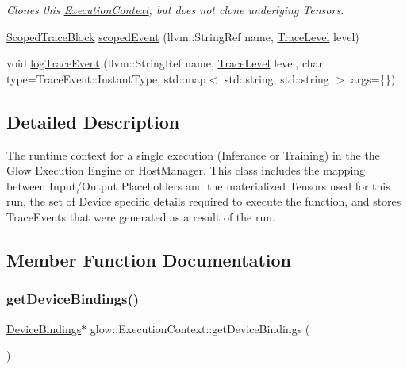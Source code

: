 \begin{DoxyCompactItemize}
\begin{DoxyCompactList}\small\item\em Clones this \hyperlink{classglow_1_1_execution_context}{Execution\+Context}, but does not clone underlying Tensors. \end{DoxyCompactList}\item 
\hyperlink{classglow_1_1_scoped_trace_block}{Scoped\+Trace\+Block} \hyperlink{classglow_1_1_execution_context_a81cef00fa3055426a4949c2f08f628a5}{scoped\+Event} (llvm\+::\+String\+Ref name, \hyperlink{structglow_1_1_trace_event_a10132a384d74408a112510cbe1b7d978}{Trace\+Level} level)
\item 
void \hyperlink{classglow_1_1_execution_context_a47595ddf5237caa5b6bb901bba1733fe}{log\+Trace\+Event} (llvm\+::\+String\+Ref name, \hyperlink{structglow_1_1_trace_event_a10132a384d74408a112510cbe1b7d978}{Trace\+Level} level, char type=Trace\+Event\+::\+Instant\+Type, std\+::map$<$ std\+::string, std\+::string $>$ args=\{\})
\end{DoxyCompactItemize}


\subsection{Detailed Description}
The runtime context for a single execution (Inferance or Training) in the the Glow Execution Engine or Host\+Manager. This class includes the mapping between Input/\+Output Placeholders and the materialized Tensors used for this run, the set of Device specific details required to execute the function, and stores Trace\+Events that were generated as a result of the run. 

\subsection{Member Function Documentation}
\mbox{\label{classglow_1_1_execution_context_ae85ee88daa4fe05462d263357f04b37d}} 
\subsubsection{\texorpdfstring{get\+Device\+Bindings()}{getDeviceBindings()}\hspace{0.1cm}{\footnotesize\ttfamily [1/2]}}
{\footnotesize\ttfamily \hyperlink{classglow_1_1_device_bindings}{Device\+Bindings}$\ast$ glow\+::\+Execution\+Context\+::get\+Device\+Bindings (\begin{DoxyParamCaption}{ }\end{DoxyParamCaption})\hspace{0.3cm}{\ttfamily [inline]}}

